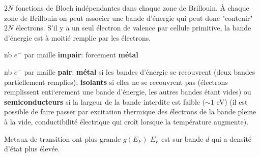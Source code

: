 $2N$ fonctions de Bloch indépendantes dans chaque zone de Brillouin.
À chaque zone de Brillouin on peut associer une bande d'énergie qui peut donc "contenir" $2N$ électrons.
S’il y a un seul électron de valence par cellule primitive, la bande d’énergie
est à moitié remplie par les électrons.
\begin{squishlist}
    \item  nb $e^-$ par maille \textbf{impair}: forcement \textbf{métal}
    \item  nb $e^-$ par maille \textbf{pair}: \textbf{métal} si les bandes d'énergie se recouvrent (deux bandes partiellement remplies); \textbf{isolants} si elles ne se recouvrent pas (électrons remplissent enti`erement une bande d’énergie, les autres bandes étant vides) ou \textbf{semiconducteurs} si la largeur de la bande interdite est faible ($\sim 1 $ eV) (il est possible de faire passer par excitation thermique des électrons de la bande pleine à la vide, conductibilité électrique qui croît lorsque la température augmente).
    \item Metaux de transition ont plus grande $g(E_F)$ $E_F$ est sur bande $d$ qui a densité d'état plus élevée.
\end{squishlist}


